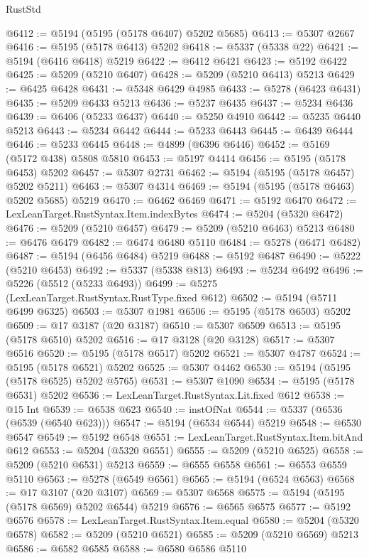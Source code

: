\begin{lexlean}{RustStd}
\begin{coremodule}
@6412 := @5194 (@5195 (@5178 @6407) @5202 @5685)
@6413 := @5307 @2667
@6416 := @5195 (@5178 @6413) @5202
@6418 := @5337 (@5338 @22)
@6421 := @5194 (@6416 @6418) @5219
@6422 := @6412 @6421
@6423 := @5192 @6422
@6425 := @5209 (@5210 @6407)
@6428 := @5209 (@5210 @6413) @5213
@6429 := @6425 @6428
@6431 := @5348 @6429 @4985
@6433 := @5278 (@6423 @6431)
@6435 := @5209 @6433 @5213
@6436 := @5237 @6435
@6437 := @5234 @6436
@6439 := @6406 (@5233 @6437)
@6440 := @5250 @4910
@6442 := @5235 @6440 @5213
@6443 := @5234 @6442
@6444 := @5233 @6443
@6445 := @6439 @6444
@6446 := @5233 @6445
@6448 := @4899 (@6396 @6446)
@6452 := @5169 (@5172 @438) @5808 @5810
@6453 := @5197 @4414
@6456 := @5195 (@5178 @6453) @5202
@6457 := @5307 @2731
@6462 := @5194 (@5195 (@5178 @6457) @5202 @5211)
@6463 := @5307 @4314
@6469 := @5194 (@5195 (@5178 @6463) @5202 @5685) @5219
@6470 := @6462 @6469
@6471 := @5192 @6470
@6472 := LexLeanTarget.RustSyntax.Item.indexBytes
@6474 := @5204 (@5320 @6472)
@6476 := @5209 (@5210 @6457)
@6479 := @5209 (@5210 @6463) @5213
@6480 := @6476 @6479
@6482 := @6474 @6480 @5110
@6484 := @5278 (@6471 @6482)
@6487 := @5194 (@6456 @6484) @5219
@6488 := @5192 @6487
@6490 := @5222 (@5210 @6453)
@6492 := @5337 (@5338 @813)
@6493 := @5234 @6492
@6496 := @5226 (@5512 (@5233 @6493))
@6499 := @5275 (LexLeanTarget.RustSyntax.RustType.fixed @612)
@6502 := @5194 (@5711 @6499 @6325)
@6503 := @5307 @1981
@6506 := @5195 (@5178 @6503) @5202
@6509 := @17 @3187 (@20 @3187)
@6510 := @5307 @6509
@6513 := @5195 (@5178 @6510) @5202
@6516 := @17 @3128 (@20 @3128)
@6517 := @5307 @6516
@6520 := @5195 (@5178 @6517) @5202
@6521 := @5307 @4787
@6524 := @5195 (@5178 @6521) @5202
@6525 := @5307 @4462
@6530 := @5194 (@5195 (@5178 @6525) @5202 @5765)
@6531 := @5307 @1090
@6534 := @5195 (@5178 @6531) @5202
@6536 := LexLeanTarget.RustSyntax.Lit.fixed @612
@6538 := @15 Int
@6539 := @6538 @623
@6540 := instOfNat
@6544 := @5337 (@6536 (@6539 (@6540 @623)))
@6547 := @5194 (@6534 @6544) @5219
@6548 := @6530 @6547
@6549 := @5192 @6548
@6551 := LexLeanTarget.RustSyntax.Item.bitAnd @612
@6553 := @5204 (@5320 @6551)
@6555 := @5209 (@5210 @6525)
@6558 := @5209 (@5210 @6531) @5213
@6559 := @6555 @6558
@6561 := @6553 @6559 @5110
@6563 := @5278 (@6549 @6561)
@6565 := @5194 (@6524 @6563)
@6568 := @17 @3107 (@20 @3107)
@6569 := @5307 @6568
@6575 := @5194 (@5195 (@5178 @6569) @5202 @6544) @5219
@6576 := @6565 @6575
@6577 := @5192 @6576
@6578 := LexLeanTarget.RustSyntax.Item.equal
@6580 := @5204 (@5320 @6578)
@6582 := @5209 (@5210 @6521)
@6585 := @5209 (@5210 @6569) @5213
@6586 := @6582 @6585
@6588 := @6580 @6586 @5110

\end{coremodule}
\end{lexlean}
